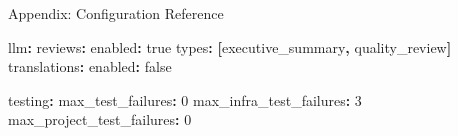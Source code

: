 \documentclass[
  ignorenonframetext,
]{beamer}
\newenvironment{Shaded}{}{}
\newcommand{\AttributeTok}[1]{\textcolor[rgb]{0.49,0.56,0.16}{#1}}
\newcommand{\CharTok}[1]{\textcolor[rgb]{0.25,0.44,0.63}{#1}}
\newcommand{\DecValTok}[1]{\textcolor[rgb]{0.25,0.63,0.44}{#1}}
\newcommand{\FunctionTok}[1]{\textcolor[rgb]{0.02,0.16,0.49}{#1}}
\newcommand{\KeywordTok}[1]{\textcolor[rgb]{0.00,0.44,0.13}{\textbf{#1}}}
\begin{document}
\begin{frame}{Appendix: Configuration
Reference}
\begin{Shaded}
\begin{Highlighting}[]
\FunctionTok{llm}\KeywordTok{:}
\AttributeTok{  }\FunctionTok{reviews}\KeywordTok{:}
\AttributeTok{    }\FunctionTok{enabled}\KeywordTok{:}\AttributeTok{ }\CharTok{true}
\AttributeTok{    }\FunctionTok{types}\KeywordTok{:}\AttributeTok{ }\KeywordTok{[}\AttributeTok{executive\_summary}\KeywordTok{,}\AttributeTok{ quality\_review}\KeywordTok{]}
\AttributeTok{  }\FunctionTok{translations}\KeywordTok{:}
\AttributeTok{    }\FunctionTok{enabled}\KeywordTok{:}\AttributeTok{ }\CharTok{false}

\FunctionTok{testing}\KeywordTok{:}
\AttributeTok{  }\FunctionTok{max\_test\_failures}\KeywordTok{:}\AttributeTok{ }\DecValTok{0}
\AttributeTok{  }\FunctionTok{max\_infra\_test\_failures}\KeywordTok{:}\AttributeTok{ }\DecValTok{3}
\AttributeTok{  }\FunctionTok{max\_project\_test\_failures}\KeywordTok{:}\AttributeTok{ }\DecValTok{0}
\end{Highlighting}
\end{Shaded}
\end{frame}
\end{document}
